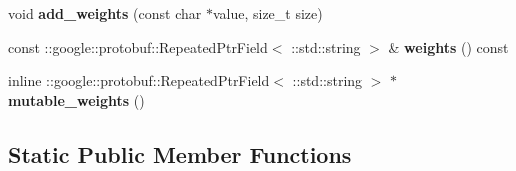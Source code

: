 \begin{DoxyCompactItemize}
void {\bfseries add\+\_\+weights} (const char $\ast$value, size\+\_\+t size)
\item 
\mbox{\label{classcaffe_1_1_solver_parameter_a69ad971974544bbf18c3205964bf2677}} 
const \+::google\+::protobuf\+::\+Repeated\+Ptr\+Field$<$ \+::std\+::string $>$ \& {\bfseries weights} () const
\item 
\mbox{\label{classcaffe_1_1_solver_parameter_abc0c4b1adcdb01fff0c7bb908a3c1419}} 
inline \+::google\+::protobuf\+::\+Repeated\+Ptr\+Field$<$ \+::std\+::string $>$ $\ast$ {\bfseries mutable\+\_\+weights} ()
\end{DoxyCompactItemize}
\subsection*{Static Public Member Functions}
